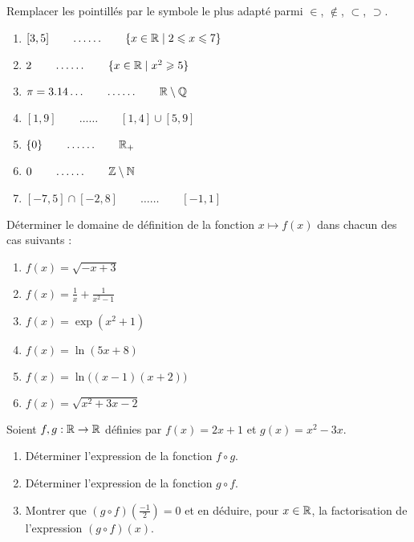 \documentclass[11pt,class=report,crop=false]{standalone}
\begin{document}


\bigskip
\bigskip


\exercice{}
\enonce
Remplacer les pointillés par le symbole le plus adapté parmi $\in$, $\notin$, $\subset$, $\supset$.

\begin{enumerate}
    \item $ [3,5] \qquad \ldots\ldots \qquad \{ x \in \mathbb{R} \mid 2 \leqslant x \leqslant 7 \} $
    \item $ 2 \qquad \ldots\ldots \qquad \{ x \in \mathbb{R} \mid x^2 \geqslant 5 \} $
    \item $\pi = 3.14\dots  \qquad \ldots\ldots \qquad \mathbb{R} \setminus \mathbb{Q} $
    \item $[1,9] \qquad \ldots\ldots \qquad [1,4] \cup [5,9] $
    \item $\{ 0 \} \qquad \ldots\ldots \qquad \mathbb{R}_+$
    \item $0 \qquad \ldots\ldots \qquad \mathbb{Z} \setminus \mathbb{N} $   
    \item $[-7,5] \cap [-2,8] \qquad \ldots\ldots \qquad [-1,1] $  
\end{enumerate}    
\finenonce

\finexercice



\exercice{}
\enonce
Déterminer le domaine de définition de la fonction $x \mapsto f(x)$ dans chacun des cas suivants :
\begin{enumerate}
    \item $f(x) = \sqrt{-x+3}$
    \item $f(x) = \frac{1}{x} + \frac{1}{x^2-1}$
    \item $f(x) = \exp(x^2+1)$
    \item $f(x) = \ln( 5x + 8 )$
    \item $f(x) = \ln\big( (x-1)(x+2) \big)$
    \item $f(x) = \sqrt{ x^2+3x-2 }$
\end{enumerate} 
\finenonce

\finexercice



\exercice{}
\enonce
Soient $f,g : \mathbb{R} \to \mathbb{R}$ définies par $f(x)=2x+1$ et $g(x)=x^2-3x$.
\begin{enumerate}
    \item Déterminer l'expression de la fonction $f \circ g$.
    \item Déterminer l'expression de la fonction $g \circ f$.
    \item Montrer que $(g\circ f)(\frac{-1}{2})=0$ et en déduire, pour $x\in \mathbb{R}$, la factorisation de l'expression $(g \circ f)(x)$.      
\end{enumerate} 
\finenonce
\end{document}
